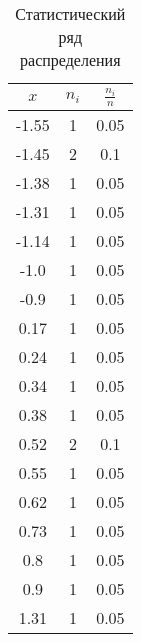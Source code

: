 \documentclass{article}
\begin{document}
  \begin{table}
    \centering
    \begin{tabular}{| c | c | c |}
        \hline
        $x$ & $n_i$ & $\frac{n_i}{n}$ \\
        \hline
        -1.55 & 1 & 0.05 \\
        \hline
        -1.45 & 2 & 0.1 \\
        \hline
        -1.38 & 1 & 0.05 \\
        \hline
        -1.31 & 1 & 0.05 \\
        \hline
        -1.14 & 1 & 0.05 \\
        \hline
        -1.0 & 1 & 0.05 \\
        \hline
        -0.9 & 1 & 0.05 \\
        \hline
        0.17 & 1 & 0.05 \\
        \hline
        0.24 & 1 & 0.05 \\
        \hline
        0.34 & 1 & 0.05 \\
        \hline
        0.38 & 1 & 0.05 \\
        \hline
        0.52 & 2 & 0.1 \\
        \hline
        0.55 & 1 & 0.05 \\
        \hline
        0.62 & 1 & 0.05 \\
        \hline
        0.73 & 1 & 0.05 \\
        \hline
        0.8 & 1 & 0.05 \\
        \hline
        0.9 & 1 & 0.05 \\
        \hline
        1.31 & 1 & 0.05 \\
        \hline
    \end{tabular}
    \caption{Статистический ряд распределения}\label{table:var}
  \end{table}
  
  

  \clearpage
  \inputminted{python}{prog.py}
\end{document}
